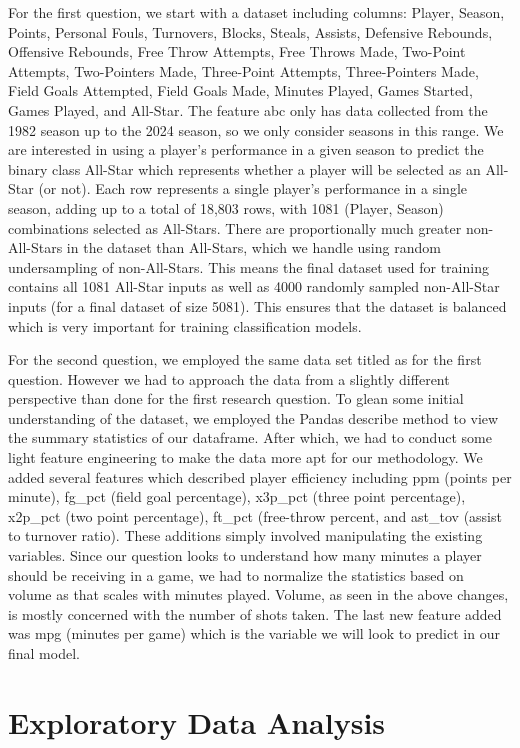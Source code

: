 \documentclass[12pt]{article}
\begin{document}
For the first question, we start with a dataset including columns: Player, Season, Points, Personal Fouls, Turnovers, Blocks, Steals, Assists, Defensive Rebounds, Offensive Rebounds, Free Throw Attempts, Free Throws Made, Two-Point Attempts, Two-Pointers Made, Three-Point Attempts, Three-Pointers Made, Field Goals Attempted, Field Goals Made, Minutes Played, Games Started, Games Played, and All-Star. The feature abc only has data collected from the 1982 season up to the 2024 season, so we only consider seasons in this range. We are interested in using a player’s performance in a given season to predict the binary class All-Star which represents whether a player will be selected as an All-Star (or not). Each row represents a single player’s performance in a single season, adding up to a total of 18,803 rows, with 1081 (Player, Season) combinations selected as All-Stars. There are proportionally much greater non-All-Stars in the dataset than All-Stars, which we handle using random undersampling of non-All-Stars. This means the final dataset used for training contains all 1081 All-Star inputs as well as 4000 randomly sampled non-All-Star inputs (for a final dataset of size 5081). This ensures that the dataset is balanced which is very important for training classification models.

For the second question, we employed the same data set titled as for the first question. However we had to approach the data from a slightly different perspective than done for the first research question. To glean some initial understanding of the dataset, we employed the Pandas describe method to view the summary statistics of our dataframe. After which, we had to conduct some light feature engineering to make the data more apt for our methodology. We added several features which described player efficiency including ppm (points per minute), fg\_pct (field goal percentage), x3p\_pct (three point percentage), x2p\_pct (two point percentage), ft\_pct (free-throw percent, and ast\_tov (assist to turnover ratio). These additions simply involved manipulating the existing variables. Since our question looks to understand how many minutes a player should be receiving in a game, we had to normalize the statistics based on volume as that scales with minutes played. Volume, as seen in the above changes, is mostly concerned with the number of shots taken. The last new feature added was mpg (minutes per game) which is the variable we will look to predict in our final model. 

\section{Exploratory Data Analysis}
\end{document}
